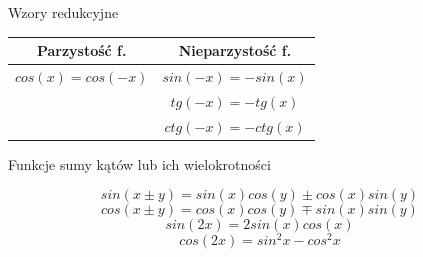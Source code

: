 \documentclass{article}
\begin{document}
\noindent
Wzory redukcyjne

\begin{table}[h!]
    \centering
    \begin{tabular}{c c}
        Parzystość f.       & Nieparzystość f. \\ \hline
        $cos(x) = cos(-x)$  & $sin(-x) = - sin(x)$ \\
                            & $tg(-x) = -tg(x)$ \\
                            & $ctg(-x) = - ctg(x)$ \\
    \end{tabular}
\end{table}

\noindent
Funkcje sumy kątów lub ich wielokrotności

$$  sin( x\pm y) = sin(x)cos(y) \pm cos(x)sin(y) $$
$$  cos( x\pm y) = cos(x)cos(y) \mp sin(x)sin(y) $$
$$  sin(2x) = 2sin(x)cos(x) $$
$$  cos(2x) = sin^2x - cos^2x   $$
\end{document}
